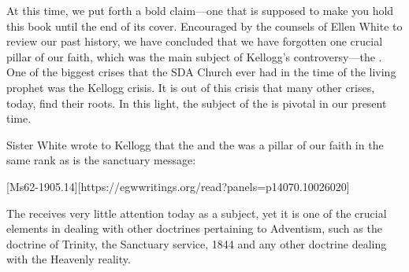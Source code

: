 At this time, we put forth a bold claim—one that is supposed to make you hold this book until the end of its cover. Encouraged by the counsels of Ellen White to review our past history, we have concluded that we have forgotten one crucial pillar of our faith, which was the main subject of Kellogg’s controversy—the . One of the biggest crises that the SDA Church ever had in the time of the living prophet was the Kellogg crisis. It is out of this crisis that many other crises, today, find their roots. In this light, the subject of the  is pivotal in our present time. 

Sister White wrote to Kellogg that the  and the  was a pillar of our faith in the same rank as is the sanctuary message:

[Ms62-1905.14][https://egwwritings.org/read?panels=p14070.10026020]

The  receives very little attention today as a subject, yet it is one of the crucial elements in dealing with other doctrines pertaining to Adventism, such as the doctrine of Trinity, the Sanctuary service, 1844 and any other doctrine dealing with the Heavenly reality.

